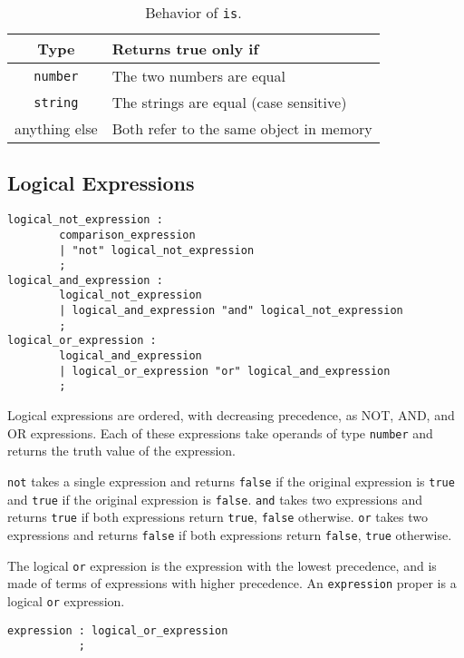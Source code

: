 \begin{table}[htdp]
\begin{center}
\begin{tabular}{|c|p{8cm}|}
\hline
Type & Returns true only if\\
\hline
\texttt{number} & The two numbers are equal\\
\texttt{string} & The strings are equal (case sensitive)\\
anything else & Both refer to the same object in memory\\
\hline
\end{tabular}
\end{center}
\caption{Behavior of \texttt{is}.}\label{isbehavior}
\end{table}

\subsection{Logical Expressions}
\begin{verbatim}
logical_not_expression : 
        comparison_expression
        | "not" logical_not_expression
        ;
logical_and_expression : 
        logical_not_expression
        | logical_and_expression "and" logical_not_expression
        ;
logical_or_expression : 
        logical_and_expression
        | logical_or_expression "or" logical_and_expression
        ;
\end{verbatim}

Logical expressions are ordered, with decreasing precedence, as NOT, AND, and OR expressions. Each of these expressions take operands of type \texttt{number} and returns the truth value of the expression.


\texttt{not} takes a single expression and returns \texttt{false} if the original expression is \texttt{true} and \texttt{true} if the original expression is \texttt{false}.
\texttt{and} takes two expressions and returns \texttt{true} if both expressions return \texttt{true}, \texttt{false} otherwise. \texttt{or} takes two expressions and returns \texttt{false} if both expressions return \texttt{false}, \texttt{true} otherwise.


The logical \texttt{or} expression is the expression with the lowest precedence, and is made of terms of expressions with higher precedence. An \texttt{expression} proper is a logical \texttt{or} expression.

\begin{verbatim}
expression : logical_or_expression
           ;
\end{verbatim}


